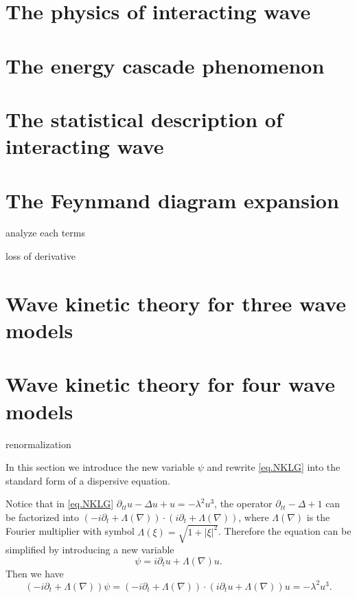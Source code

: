 \section{The physics of interacting wave}


\section{The energy cascade phenomenon}

\section{The statistical description of interacting wave}

\section{The Feynmand diagram expansion}

analyze each terms

loss of derivative

\section{Wave kinetic theory for three wave models}

\section{Wave kinetic theory for four wave models}

renormalization


In this section we introduce the new variable $\psi$ and rewrite \eqref{eq.NKLG} into the standard form of a dispersive equation. 



Notice that in \eqref{eq.NKLG} $\partial_{tt} u - \Delta u +u = -\lambda^2 u^3$, the operator
$\partial_{tt}-\Delta +1$ can be factorized into $(-i\partial_t+\Lambda(\nabla))\cdot(i\partial_t+\Lambda(\nabla))$, where $\Lambda(\nabla)$ is the Fourier multiplier with symbol $\Lambda(\xi)=\sqrt{1+|\xi|^2}$. Therefore the equation can be simplified by introducing a new variable
\begin{equation}
    \psi=i\partial_tu+\Lambda(\nabla)u.
\end{equation}
Then we have
\begin{equation}\label{eq.firstorderderivation}
    (-i\partial_t+\Lambda(\nabla))\psi=(-i\partial_t+\Lambda(\nabla))\cdot(i\partial_tu+\Lambda(\nabla))u=-\lambda^2 u^3.
\end{equation} 

